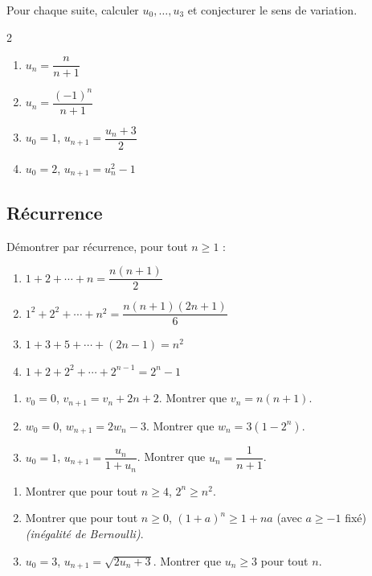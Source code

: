 Pour chaque suite, calculer $u_0,\dots,u_3$ et conjecturer le sens de
variation.
\begin{multicols}{2}
\begin{enumerate}
	\item $u_n=\dfrac{n}{n+1}$
	\item $u_n=\dfrac{(-1)^{n}}{n+1}$
	\item $u_0=1$, $u_{n+1}=\dfrac{u_n+3}{2}$
	\item $u_0=2$, $u_{n+1}=u_n^{2}-1$
\end{enumerate}
\end{multicols}

\subsection{Récurrence}

Démontrer par récurrence, pour tout $n\geq 1$ :
\begin{enumerate}
	\item $1+2+\cdots+n=\dfrac{n(n+1)}{2}$
	\item $1^{2}+2^{2}+\cdots+n^{2}=\dfrac{n(n+1)(2n+1)}{6}$
	\item $1+3+5+\cdots+(2n-1)=n^{2}$
	\item $1+2+2^{2}+\cdots+2^{n-1}=2^{n}-1$
\end{enumerate}

\begin{enumerate}
	\item $v_0=0$, $v_{n+1}=v_n+2n+2$. Montrer que $v_n=n(n+1)$.
	\item $w_0=0$, $w_{n+1}=2w_n-3$. Montrer que $w_n=3(1-2^{n})$.
	\item $u_0=1$, $u_{n+1}=\dfrac{u_n}{1+u_n}$. Montrer que
	$u_n=\dfrac{1}{n+1}$.
\end{enumerate}

\begin{enumerate}
	\item Montrer que pour tout $n\geq 4$, $2^{n}\geq n^{2}$.
	\item Montrer que pour tout $n\geq 0$, $(1+a)^{n}\geq 1+na$
	(avec $a\geq -1$ fixé) \emph{(inégalité de Bernoulli)}.
	\item $u_0=3$, $u_{n+1}=\sqrt{2u_n+3}$. Montrer que $u_n\geq 3$ pour
	tout $n$.
\end{enumerate}

